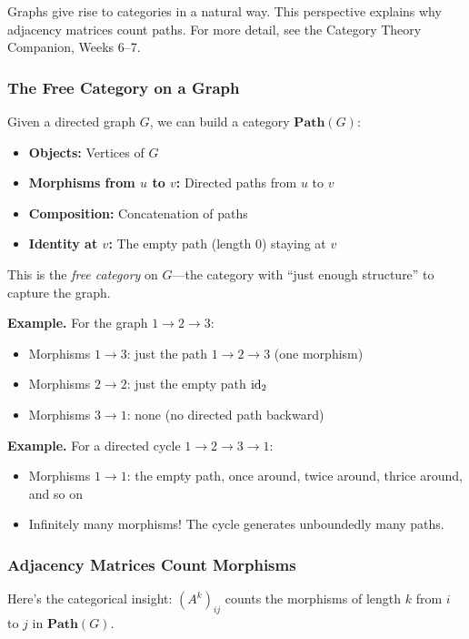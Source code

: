 \begin{goingdeeper}
Graphs give rise to categories in a natural way. This perspective explains why adjacency matrices count paths.
For more detail, see the Category Theory Companion, Weeks 6--7.

\subsubsection*{The Free Category on a Graph}

Given a directed graph $G$, we can build a category $\mathbf{Path}(G)$:
\begin{itemize}
  \item \textbf{Objects:} Vertices of $G$
  \item \textbf{Morphisms from $u$ to $v$:} Directed paths from $u$ to $v$
  \item \textbf{Composition:} Concatenation of paths
  \item \textbf{Identity at $v$:} The empty path (length 0) staying at $v$
\end{itemize}

This is the \emph{free category} on $G$---the category with ``just enough structure'' to capture the graph.

\textbf{Example.} For the graph $1 \to 2 \to 3$:
\begin{itemize}
  \item Morphisms $1 \to 3$: just the path $1 \to 2 \to 3$ (one morphism)
  \item Morphisms $2 \to 2$: just the empty path $\operatorname{id}_2$
  \item Morphisms $3 \to 1$: none (no directed path backward)
\end{itemize}

\textbf{Example.} For a directed cycle $1 \to 2 \to 3 \to 1$:
\begin{itemize}
  \item Morphisms $1 \to 1$: the empty path, once around, twice around, thrice around, and so on
  \item Infinitely many morphisms! The cycle generates unboundedly many paths.
\end{itemize}

\subsubsection*{Adjacency Matrices Count Morphisms}

Here's the categorical insight: $(A^k)_{ij}$ counts the morphisms of length $k$ from $i$ to $j$ in $\mathbf{Path}(G)$.


\end{goingdeeper}

